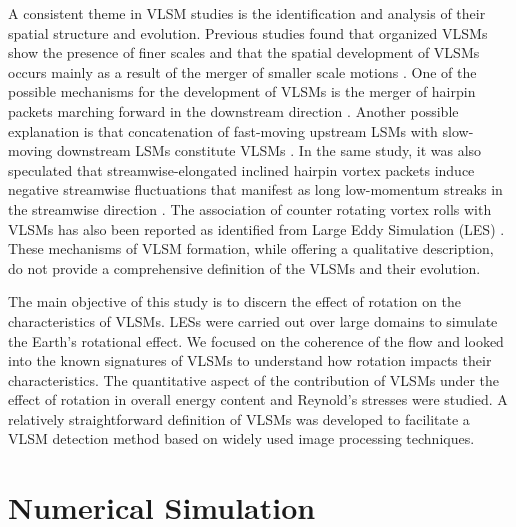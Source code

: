 A consistent theme in VLSM studies is the identification and analysis of their spatial structure and evolution. Previous studies found that organized  VLSMs show the presence of finer scales and that the spatial development of VLSMs occurs mainly as a result of the merger of smaller scale motions \cite{Lee_sung_jfm11,baltzer_jfm_13,lee_sung_jfm_14}. One of the possible mechanisms for the development of VLSMs is the merger of  hairpin packets marching forward in the downstream direction \cite{Lee_sung_jfm11}. Another possible  explanation is that concatenation of fast-moving upstream LSMs with slow-moving downstream LSMs constitute VLSMs \cite{lee_sung_jfm_14}. In the same study, it was also speculated that streamwise-elongated inclined hairpin vortex packets induce negative streamwise fluctuations that manifest as long low-momentum streaks in the streamwise direction \cite{lee_sung_jfm_14}. The association of counter rotating vortex rolls with VLSMs has also been reported as identified from Large Eddy Simulation (LES) \cite{fang2015blm}.  These  mechanisms of VLSM formation, while offering a qualitative description, do not provide a comprehensive definition of the VLSMs and their evolution.
 
The main objective of this study is to discern the effect of rotation on the characteristics of VLSMs.  LESs were carried out over large domains to simulate the Earth's rotational effect.  We focused on the coherence of the flow and looked into the  known  signatures of VLSMs to understand how rotation impacts their characteristics.  The quantitative aspect of the contribution of VLSMs under the effect of rotation  in overall energy content and  Reynold's stresses were studied.  A relatively straightforward  definition of VLSMs was developed to facilitate a VLSM detection method based on widely used image processing techniques. 

\section{Numerical Simulation}
\label{sec:num_sim_chap_1}

